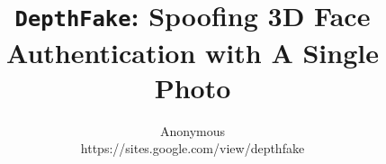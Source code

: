 \documentclass[conference,compsoc]{IEEEtran}
\begin{document}
	\pagestyle{plain}

\title{ \Large \bf \texttt{DepthFake}: Spoofing 3D Face Authentication with A Single Photo
\\
}

\author{Anonymous\\https://sites.google.com/view/depthfake}

\maketitle







% 










%
\end{document}
